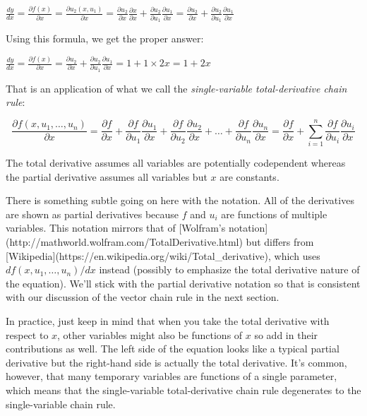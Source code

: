 \documentclass[11pt]{article}
\begin{document}
$\frac{dy}{dx} = \frac{\partial f(x)}{\partial x} = \frac{\partial u_2(x,u_1)}{\partial x} = \frac{\partial u_2}{\partial x}\frac{\partial x}{\partial x} + \frac{\partial u_2}{\partial u_1}\frac{\partial u_1}{\partial x} = \frac{\partial u_2}{\partial x} + \frac{\partial u_2}{\partial u_1}\frac{\partial u_1}{\partial x}$

Using this formula, we get the proper answer:

$\frac{dy}{dx} = \frac{\partial f(x)}{\partial x} = \frac{\partial u_2}{\partial x} + \frac{\partial u_2}{\partial u_1}\frac{\partial  u_1}{\partial  x} = 1 + 1 \times 2x = 1 + 2x$

That is an application of what we call the {\em single-variable total-derivative chain rule}:

\[
\frac{\partial f(x,u_1,\ldots,u_n)}{\partial x} = \frac{\partial f}{\partial x} + \frac{\partial f}{\partial u_1}\frac{\partial  u_1}{\partial  x} + \frac{\partial f}{\partial u_2}\frac{\partial  u_2}{\partial  x} + \ldots + \frac{\partial f}{\partial u_n}\frac{\partial  u_n}{\partial x} = \frac{\partial f}{\partial x} + \sum_{i=1}^n \frac{\partial f}{\partial u_i}\frac{\partial  u_i}{\partial  x}
\]

The total derivative assumes all variables are potentially codependent whereas the partial derivative assumes all variables but $x$ are constants.

There is something subtle going on here with the notation. All of the derivatives are shown as partial derivatives because $f$ and $u_i$ are functions of multiple variables. This notation mirrors that of [Wolfram's notation](http://mathworld.wolfram.com/TotalDerivative.html) but differs from  [Wikipedia](https://en.wikipedia.org/wiki/Total\_derivative), which uses ${d f(x,u_1,\ldots,u_n)}/{d x}$ instead (possibly to emphasize the total derivative nature of the equation). We'll stick with the partial derivative notation so that is consistent with our discussion of the vector chain rule in the next section.

In practice, just keep in mind that when you take the total derivative with respect to $x$, other variables might also be functions of $x$ so add in their contributions as well.  The left side of the equation looks like a typical partial derivative but the right-hand side is actually the total derivative.  It's common, however, that many temporary variables are functions of a single parameter, which means that the single-variable total-derivative chain rule degenerates to the single-variable chain rule.
\end{document}
